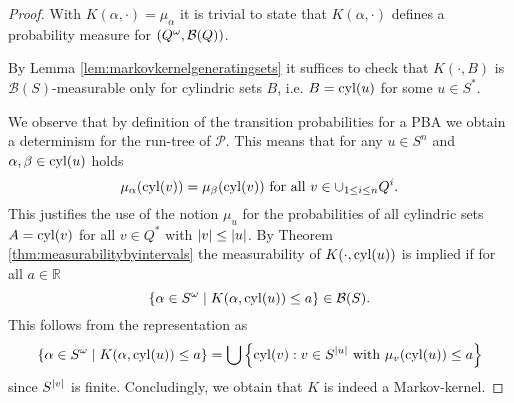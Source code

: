 \begin{proof}
  With $K(\alpha,\cdot) = \mu_{\alpha}$ it is trivial to state that
  $K(\alpha,\cdot)$ defines a probability measure for
  $\left(Q^{\omega},\mathcal{B}(Q)\right)$.

  By Lemma \ref{lem:markovkernelgeneratingsets} it suffices to check that
  $K(\cdot, B)$ is $\mathcal{B}(S)$-measurable only for cylindric sets $B$,
  i.e. $B = \operatorname{cyl}(u)$ for some $u\in S^{*}$.

  We observe that by definition of the transition probabilities for a \ac{PBA}
  we obtain a determinism for the run-tree of $\mathcal{P}$. This means that
  for any $u\in S^{n}$ and $\alpha, \beta\in\operatorname{cyl}(u)$ holds
  \begin{equation*}
    \mu_{\alpha}(\operatorname{cyl}(v)) = \mu_{\beta}(\operatorname{cyl}(v))\text{ for all }v\in
      \cup_{1\leq i\leq n}Q^{i}.
  \end{equation*}
  This justifies the use of the notion $\mu_{u}$ for the probabilities of all
  cylindric sets $A = \operatorname{cyl}(v)$ for all $v\in Q^{*}$ with
  $\left\vert{v}\right\vert\leq\left\vert{u}\right\vert$. By Theorem \ref{thm:measurabilitybyintervals} the
  measurability of $K(\cdot, \operatorname{cyl}(u))$ is implied if for all $a\in\mathbb{R}$
  \begin{equation*}
    \left\{\alpha\in S^{\omega}\mid K(\alpha, \operatorname{cyl}(u))\leq a\right\}\in\mathcal{B}(S).
  \end{equation*}
  This follows from the representation as
  \begin{equation*}
    \left\{\alpha\in S^{\omega}\mid K(\alpha, \operatorname{cyl}(u))\leq a\right\} = 
      \bigcup\left\{
        \operatorname{cyl}(v):v\in S^{\left\vert{u}\right\vert}\text{ with }\mu_{v}(\operatorname{cyl}(u))\leq a
      \right\}
  \end{equation*}
  since $S^{\left\vert{v}\right\vert}$ is finite. Concludingly, we obtain that $K$ is indeed a
  Markov-kernel.
\end{proof}

